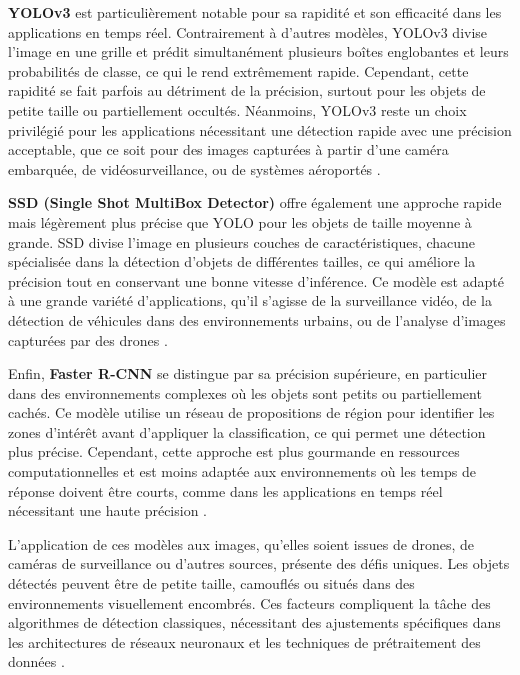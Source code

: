 \textbf{YOLOv3} \cite{redmon2016yolo} est particulièrement notable pour sa rapidité et son efficacité dans les applications en temps réel. Contrairement à d'autres modèles, YOLOv3 divise l'image en une grille et prédit simultanément plusieurs boîtes englobantes et leurs probabilités de classe, ce qui le rend extrêmement rapide. Cependant, cette rapidité se fait parfois au détriment de la précision, surtout pour les objets de petite taille ou partiellement occultés. Néanmoins, YOLOv3 reste un choix privilégié pour les applications nécessitant une détection rapide avec une précision acceptable, que ce soit pour des images capturées à partir d'une caméra embarquée, de vidéosurveillance, ou de systèmes aéroportés \cite{gupta2021}.

\textbf{SSD (Single Shot MultiBox Detector)} \cite{liu2016ssd} offre également une approche rapide mais légèrement plus précise que YOLO pour les objets de taille moyenne à grande. SSD divise l'image en plusieurs couches de caractéristiques, chacune spécialisée dans la détection d'objets de différentes tailles, ce qui améliore la précision tout en conservant une bonne vitesse d'inférence. Ce modèle est adapté à une grande variété d'applications, qu'il s'agisse de la surveillance vidéo, de la détection de véhicules dans des environnements urbains, ou de l'analyse d'images capturées par des drones \cite{kamran2020}.

Enfin, \textbf{Faster R-CNN} \cite{girshick2016rcnn} se distingue par sa précision supérieure, en particulier dans des environnements complexes où les objets sont petits ou partiellement cachés. Ce modèle utilise un réseau de propositions de région pour identifier les zones d'intérêt avant d'appliquer la classification, ce qui permet une détection plus précise. Cependant, cette approche est plus gourmande en ressources computationnelles et est moins adaptée aux environnements où les temps de réponse doivent être courts, comme dans les applications en temps réel nécessitant une haute précision \cite{kamran2020}.

L'application de ces modèles aux images, qu'elles soient issues de drones, de caméras de surveillance ou d'autres sources, présente des défis uniques. Les objets détectés peuvent être de petite taille, camouflés ou situés dans des environnements visuellement encombrés. Ces facteurs compliquent la tâche des algorithmes de détection classiques, nécessitant des ajustements spécifiques dans les architectures de réseaux neuronaux et les techniques de prétraitement des données \cite{gupta2021}.

